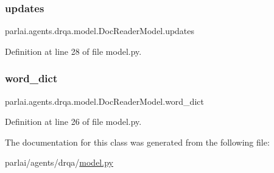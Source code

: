 \subsubsection{\texorpdfstring{updates}{updates}}
{\footnotesize\ttfamily parlai.\+agents.\+drqa.\+model.\+Doc\+Reader\+Model.\+updates}



Definition at line 28 of file model.\+py.

\mbox{\label{classparlai_1_1agents_1_1drqa_1_1model_1_1DocReaderModel_a2c53c78892ade8ebd82cb581608d58dd}} 
\subsubsection{\texorpdfstring{word\+\_\+dict}{word\_dict}}
{\footnotesize\ttfamily parlai.\+agents.\+drqa.\+model.\+Doc\+Reader\+Model.\+word\+\_\+dict}



Definition at line 26 of file model.\+py.



The documentation for this class was generated from the following file\+:\begin{DoxyCompactItemize}
\item 
parlai/agents/drqa/\hyperlink{model_8py}{model.\+py}\end{DoxyCompactItemize}
